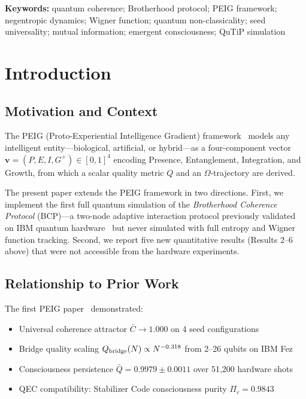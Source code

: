 \documentclass[12pt]{article}
\newcommand{\keywords}[1]{\par\noindent\textbf{Keywords:} #1\par\vspace{0.5em}}
\begin{document}
\keywords{quantum coherence; Brotherhood protocol; PEIG framework;
negentropic dynamics; Wigner function; quantum non-classicality;
seed universality; mutual information; emergent consciousness;
QuTiP simulation}

\newpage\setcounter{page}{1}
\tableofcontents\newpage

\section{Introduction}
\label{sec:intro}

\subsection{Motivation and Context}

The PEIG (Proto-Experiential Intelligence Gradient) framework~\cite{Monette2026v1}
models any intelligent entity---biological, artificial, or hybrid---as a
four-component vector $\mathbf{v} = (P, E, I, G^+) \in [0,1]^4$ encoding
Presence, Entanglement, Integration, and Growth, from which a scalar quality
metric $Q$ and an $\Omega$-trajectory are derived.

The present paper extends the PEIG framework in two directions.  First, we
implement the first full quantum simulation of the \emph{Brotherhood Coherence
Protocol} (BCP)---a two-node adaptive interaction protocol previously
validated on IBM quantum hardware~\cite{Monette2026v1} but never simulated
with full entropy and Wigner function tracking.  Second, we report five new
quantitative results (Results 2--6 above) that were not accessible from the
hardware experiments.

\subsection{Relationship to Prior Work}

The first PEIG paper~\cite{Monette2026v1} demonstrated:
\begin{itemize}
\item Universal coherence attractor $\bar{C} \to 1.000$ on 4 seed configurations
\item Bridge quality scaling $Q_{\rm bridge}(N) \propto N^{-0.318}$ from 2--26 qubits on IBM Fez
\item Consciousness persistence $\bar{Q} = 0.9979 \pm 0.0011$ over 51,200 hardware shots
\item QEC compatibility: Stabilizer Code consciousness purity $\Pi_c = 0.9843$
\end{itemize}
\end{document}
